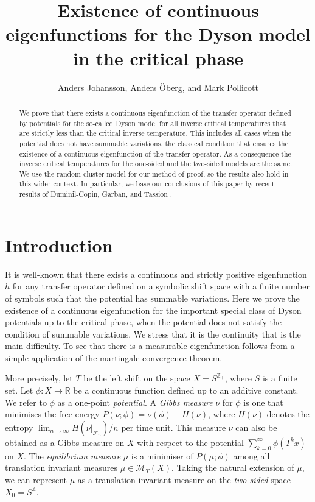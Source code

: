 \documentclass[11pt, a4paper]{amsart}
\title[Existence of continuous eigenfunction]{Existence of continuous eigenfunctions for the Dyson model in the critical phase}
\author{Anders Johansson, Anders \"Oberg, and Mark Pollicott}
\date{}
\theoremstyle{definition}
\theoremstyle{remark}
\providecommand{\RR}{\mathbb{R}}
\providecommand{\ZZ}{\mathbb{Z}}
\providecommand{\CF}{\mathscr{F}}
\providecommand{\CM}{\mathscr{M}}
\def\X{X}
\def\T{T}
\begin{document}
\maketitle
\begin{abstract}
  We prove that there exists a continuous eigenfunction of the transfer operator
  defined by potentials for the so-called Dyson model for all inverse critical
  temperatures that are strictly less than the critical inverse temperature.
  This includes all cases when the potential does not have summable variations,
  the classical condition that ensures the existence of a continuous
  eigenfunction of the transfer operator. As a consequence the inverse critical
  temperatures for the one-sided and the two-sided models are the same. We use
  the random cluster model for our method of proof, so the results also hold in
  this wider context. In particular, we base our conclusions of this paper by
  recent results of Duminil-Copin, Garban, and Tassion \cite{duminil}.
\end{abstract}
\def\h{h}


\section{Introduction}\noindent

It is well-known \cite{walters1} that there exists a continuous and strictly
positive eigenfunction $h$ for any transfer operator defined on a symbolic shift
space with a finite number of symbols such that the potential has summable
variations. Here we prove the existence of a continuous eigenfunction for the
important special class of Dyson potentials up to the critical phase, when the
potential does not satisfy the condition of summable variations. We stress that
it is the continuity that is the main difficulty. To see that there is a
measurable eigenfunction follows from a simple application of the martingale
convergence theorem.

More precisely, let $\T$ be the left shift on the space $\X=S^{{\mathbb Z}_+}$,
where $S$ is a finite set. Let $\phi:\X\to \RR$ be a continuous function defined
up to an additive constant. We refer to $\phi$ as a one-point \emph{potential}.
A \emph{Gibbs measure} $\nu$ for $\phi$ is one that minimises the free energy
$P(\nu;\phi)=\nu(\phi)-H(\nu)$, where $H(\nu)$ denotes the entropy
$\lim_{n\to\infty} H(\nu\vert_{\CF_n})/n$ per time unit. This measure $\nu$ can
also be obtained as a Gibbs measure on $\X$ with respect to the potential
$\sum_{k=0}^\infty \phi(\T^k x)$ on $\X$. The \emph{equilibrium measure} $\mu$
is a minimiser of $P(\mu;\phi)$ among all translation invariant measures
$\mu\in{\CM}_T(\X)$. Taking the natural extension of $\mu$, we can represent
$\mu$ as a translation invariant measure on the \emph{two-sided} space
$\X_0 = S^\ZZ$.
\end{document}
